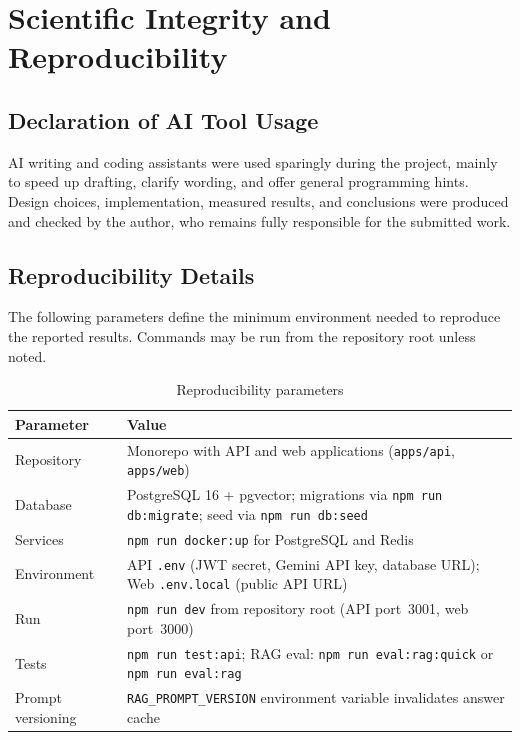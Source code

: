 \chapter{Scientific Integrity and Reproducibility}
\label{annex:integrity}

\section{Declaration of AI Tool Usage}
\label{sec:annex-b-ai-declaration}

AI writing and coding assistants were used sparingly during the project, mainly to
speed up drafting, clarify wording, and offer general programming hints. Design
choices, implementation, measured results, and conclusions were produced and
checked by the author, who remains fully responsible for the submitted work.

\section{Reproducibility Details}
\label{sec:annex-b-reproducibility}

The following parameters define the minimum environment needed to reproduce the
reported results. Commands may be run from the repository root unless noted.

\begin{table}[H]
\centering
\caption{Reproducibility parameters}
\label{tab:reproducibility}
\footnotesize
\renewcommand{\arraystretch}{1.35}
\setlength{\tabcolsep}{4pt}
\begin{tabularx}{\textwidth}{|>{\RaggedRight\arraybackslash}p{3.2cm}|Y|}
\hline
\textbf{Parameter} & \textbf{Value} \\
\hline
Repository &
Monorepo with API and web applications (\texttt{apps/api}, \texttt{apps/web}) \\
\hline
Database &
PostgreSQL 16 + pgvector; migrations via \texttt{npm run db:migrate}; seed via \texttt{npm run db:seed} \\
\hline
Services &
\texttt{npm run docker:up} for PostgreSQL and Redis \\
\hline
Environment &
API \texttt{.env} (JWT secret, Gemini API key, database URL);\newline
Web \texttt{.env.local} (public API URL) \\
\hline
Run &
\texttt{npm run dev} from repository root (API port~3001, web port~3000) \\
\hline
Tests &
\texttt{npm run test:api}; RAG eval: \texttt{npm run eval:rag:quick} or \texttt{npm run eval:rag} \\
\hline
Prompt versioning &
\texttt{RAG\_PROMPT\_VERSION} environment variable invalidates answer cache \\
\hline
\end{tabularx}
\end{table}

